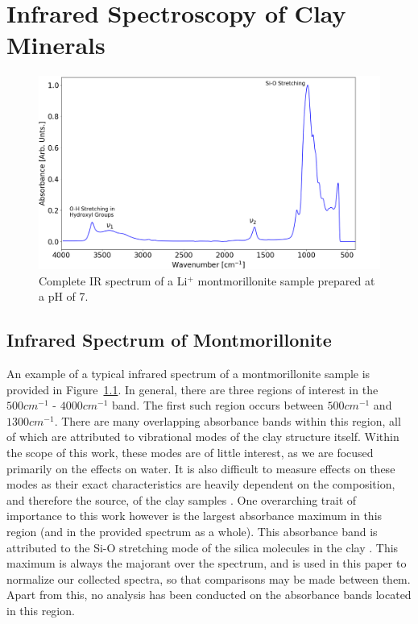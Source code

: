 
\chapter{Infrared Spectroscopy of Clay Minerals}

\begin{figure}
	\centering
	\includegraphics[scale=0.5]{images/spectrum_labels.png}
	\caption{Complete IR spectrum of a Li$^{\bm{+}}$ montmorillonite sample prepared at a pH of 7.}
	\label{fig:spectrum}
\end{figure}

\section{Infrared Spectrum of Montmorillonite}
An example of a typical infrared spectrum of a montmorillonite sample is provided in Figure~\ref{fig:spectrum}. In general, there are three regions of interest in the $500cm^{-1}$ - $4000cm^{-1}$ band. The first such region occurs between $500cm^{-1}$ and $1300cm^{-1}$. There are many overlapping absorbance bands within this region, all of which are attributed to vibrational modes of the clay structure itself. Within the scope of this work, these modes are of little interest, as we are focused primarily on the effects on water. It is also difficult to measure effects on these modes as their exact characteristics are heavily dependent on the composition, and therefore the source, of the clay samples \cite{madejova2001baseline}. One overarching trait of importance to this work however is the largest absorbance maximum in this region (and in the provided spectrum as a whole). This absorbance band is attributed to the Si-O stretching mode of the silica molecules in the clay \cite{madejova2001baseline}. This maximum is always the majorant over the spectrum, and is used in this paper to normalize our collected spectra, so that comparisons may be made between them. Apart from this, no analysis has been conducted on the absorbance bands located in this region.

